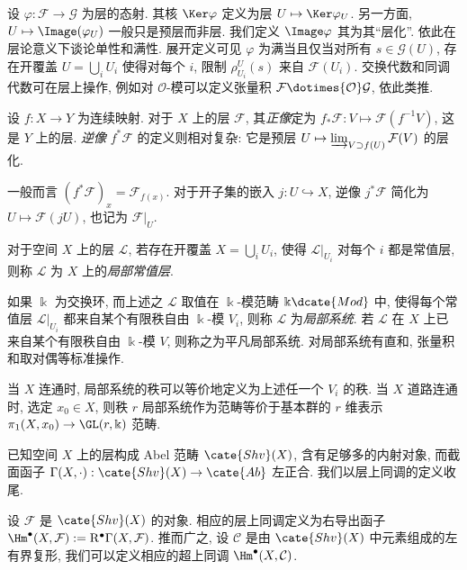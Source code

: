 设 $\varphi: \mathcal{F} \to \mathcal{G}$ 为层的态射. 其核 $\Ker\varphi$ 定义为层 $U \mapsto \Ker \varphi_U$. 另一方面, $U \mapsto \Image(\varphi_U)$ 一般只是预层而非层. 我们定义 $\Image\varphi$ 其为其``层化''. 依此在层论意义下谈论单性和满性. 展开定义可见 $\varphi$ 为满当且仅当对所有 $s \in \mathcal{G}(U)$, 存在开覆盖 $U = \bigcup_i U_i$ 使得对每个 $i$, 限制 $\rho^U_{U_i}(s)$ 来自 $\mathcal{F}(U_i)$. 交换代数和同调代数可在层上操作, 例如对 $\mathcal{O}$-模可以定义张量积 $\mathcal{F} \dotimes{\mathcal{O}} \mathcal{G}$, 依此类推.

设 $f: X \to Y$ 为连续映射. 对于 $X$ 上的层 $\mathcal{F}$, 其\emph{正像}定为 $f_* \mathcal{F}: V \mapsto \mathcal{F}(f^{-1} V)$, 这是 $Y$ 上的层. \emph{逆像} $f^* \mathcal{F}$ 的定义则相对复杂: 它是预层 $U \mapsto \varinjlim_{V \supset f(U)} \mathcal{F}(V)$ 的层化.

一般而言 $(f^* \mathcal{F})_x = \mathcal{F}_{f(x)}$. 对于开子集的嵌入 $j: U \hookrightarrow X$, 逆像 $j^* \mathcal{F}$ 简化为 $U \mapsto \mathcal{F}(jU)$, 也记为 $\mathcal{F}|_U$.

\begin{definition} 
	对于空间 $X$ 上的层 $\mathcal{L}$, 若存在开覆盖 $X = \bigcup_i U_i$, 使得 $\mathcal{L}|_{U_i}$ 对每个 $i$ 都是常值层, 则称 $\mathcal{L}$ 为 $X$ 上的\emph{局部常值层}.
	
	如果 $\Bbbk$ 为交换环, 而上述之 $\mathcal{L}$ 取值在 $\Bbbk$-模范畴 $\Bbbk\dcate{Mod}$ 中, 使得每个常值层 $\mathcal{L}|_{U_i}$ 都来自某个有限秩自由 $\Bbbk$-模 $V_i$, 则称 $\mathcal{L}$ 为\emph{局部系统}. 若 $\mathcal{L}$ 在 $X$ 上已来自某个有限秩自由 $\Bbbk$-模 $V$, 则称之为平凡局部系统. 对局部系统有直和, 张量积和取对偶等标准操作.
\end{definition}

当 $X$ 连通时, 局部系统的秩可以等价地定义为上述任一个 $V_i$ 的秩. 当 $X$ 道路连通时, 选定 $x_0 \in X$, 则秩 $r$ 局部系统作为范畴等价于基本群的 $r$ 维表示 $\pi_1(X, x_0) \to \GL(r, \Bbbk)$ 范畴.

已知空间 $X$ 上的层构成 Abel 范畴 $\cate{Shv}(X)$, 含有足够多的内射对象, 而截面函子 $\Gamma(X, \cdot): \cate{Shv}(X) \to \cate{Ab}$ 左正合. 我们以层上同调的定义收尾. 

\begin{definition}
	设 $\mathcal{F}$ 是 $\cate{Shv}(X)$ 的对象. 相应的层上同调定义为右导出函子 $\Hm^\bullet(X, \mathcal{F}) := \mathrm{R}^\bullet \Gamma(X, \mathcal{F})$. 推而广之, 设 $\mathcal{C}$ 是由 $\cate{Shv}(X)$ 中元素组成的左有界复形, 我们可以定义相应的超上同调 $\Hm^\bullet(X, \mathcal{C})$.
\end{definition}


